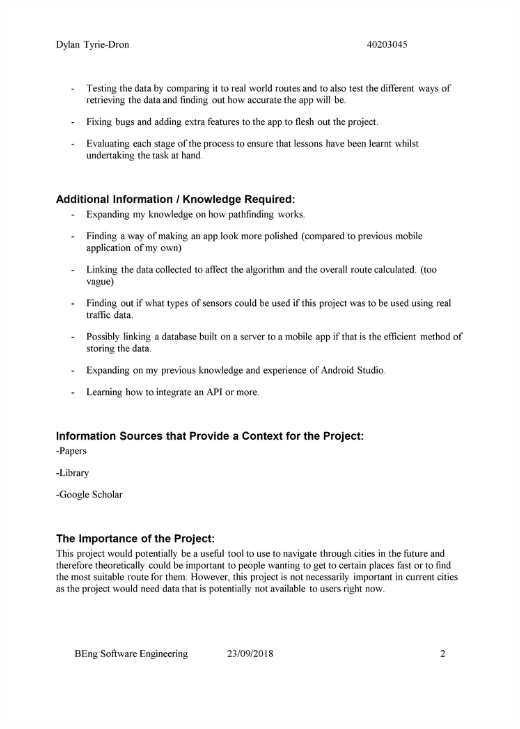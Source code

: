 \documentclass[12pt,a4paper]{article}
\begin{document}
\begin{appendices}
\includegraphics[width=\textwidth,height=\textheight,keepaspectratio]{IPOPage2.png}
\newpage

\end{appendices}
\end{document}
